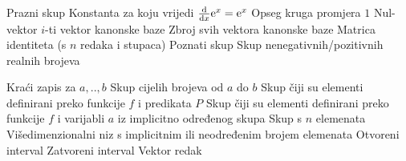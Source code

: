	{Prazni skup}
	{Konstanta za koju vrijedi $\od{}{x}\const e^x=\const e^x$}
	{Opseg kruga promjera $1$}
	{Nul-vektor}
	{$i$-ti vektor kanonske baze}
	{Zbroj svih vektora kanonske baze}
	{Matrica identiteta (s $n$ redaka i stupaca)}
	{Poznati skup}
	{Skup nenegativnih/pozitivnih realnih brojeva}

	{Kraći zapis za $a,..,b$}
	{Skup cijelih brojeva od $a$ do $b$}
	{Skup čiji su elementi definirani preko funkcije $f$ i predikata $P$}
	{Skup čiji su elementi definirani preko funkcije $f$ i varijabli $a$ iz implicitno određenog skupa}
	{Skup s $n$ elemenata}
	{Višedimenzionalni niz s implicitnim ili neodređenim brojem elemenata}
	{Otvoreni interval}
	{Zatvoreni interval}
	{Vektor redak}

